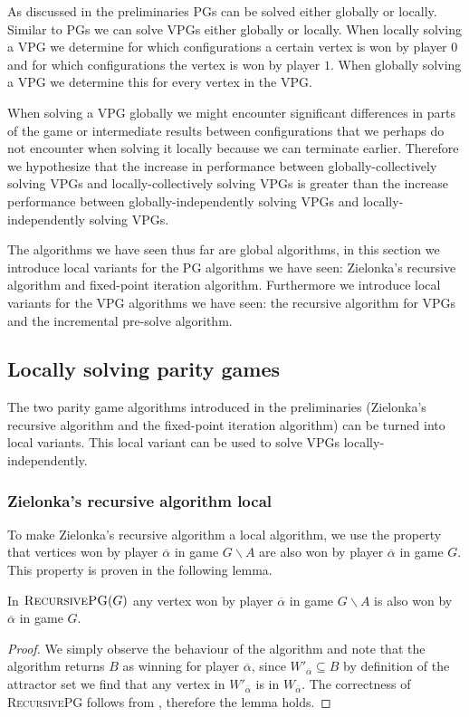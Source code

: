 As discussed in the preliminaries PGs can be solved either globally or locally. Similar to PGs we can solve VPGs either globally or locally. When locally solving a VPG we determine for which configurations a certain vertex is won by player $0$ and for which configurations the vertex is won by player $1$. When globally solving a VPG we determine this for every vertex in the VPG.

When solving a VPG globally we might encounter significant differences in parts of the game or intermediate results between configurations that we perhaps do not encounter when solving it locally because we can terminate earlier. Therefore we hypothesize that the increase in performance between globally-collectively solving VPGs and locally-collectively solving VPGs is greater than the increase performance between globally-independently solving VPGs and locally-independently solving VPGs.

The algorithms we have seen thus far are global algorithms, in this section we introduce local variants for the PG algorithms we have seen: Zielonka's recursive algorithm and fixed-point iteration algorithm. Furthermore we introduce local variants for the VPG algorithms we have seen: the recursive algorithm for VPGs and the incremental pre-solve algorithm.

\subsection{Locally solving parity games}
The two parity game algorithms introduced in the preliminaries (Zielonka's recursive algorithm and the fixed-point iteration algorithm) can be turned into local variants. This local variant can be used to solve VPGs locally-independently.

\subsubsection{Zielonka's recursive algorithm local}
\label{sec:zlnk_org_local}
To make Zielonka's recursive algorithm a local algorithm, we use the property that vertices won by player $\overline{\alpha}$ in game $G \backslash A$ are also won by player $\overline{\alpha}$ in game $G$. This property is proven in the following lemma.
\begin{lemma}
	\label{lem_overlinealphawinner}
	In $\textsc{RecursivePG}(G)$ any vertex won by player $\overline{\alpha}$ in game $G\backslash A$ is also won by $\overline{\alpha}$ in game $G$.
	\begin{proof}
		We simply observe the behaviour of the algorithm and note that the algorithm returns $B$ as winning for player $\overline{\alpha}$, since $W'_{\overline{\alpha}} \subseteq B$ by definition of the attractor set we find that any vertex in $W'_{\overline{\alpha}}$ is in $W_{\overline{\alpha}}$. The correctness of \textsc{RecursivePG} follows from \cite{ZIELONKA1998135}, therefore the lemma holds.
	\end{proof}
\end{lemma}

